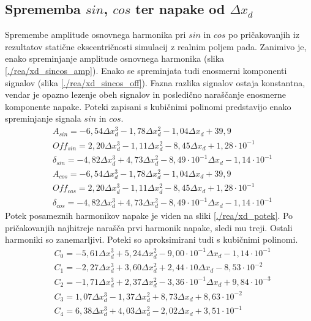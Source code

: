 \subsection{Sprememba $sin$, $cos$ ter napake od $\Delta x_d$}
Spremembe amplitude osnovnega harmonika pri $sin$ in $cos$ po pričakovanjih iz rezultatov statične ekscentričnosti simulacij z realnim poljem pada. Zanimivo je, enako spreminjanje amplitude osnovnega harmonika (slika \ref{./rea/xd_sincos_amp}). Enako se spreminjata tudi enosmerni komponenti signalov (slika \ref{./rea/xd_sincos_off}). Fazna razlika signalov ostaja konstantna, vendar je opazno lezenje obeh signalov in posledično naraščanje enosmerne komponente napake.
Poteki zapisani s kubičnimi polinomi predstavijo enako spreminjanje signala $sin$ in $cos$.
\begin{eqnarray}
&A_{sin} = -6,54\Delta x_d^3-1,78\Delta x_d^2-1,04\Delta x_d+39,9\\     
&Off_{sin} = 2,20\Delta x_d^3-1,11\Delta x_d^2-8,45\Delta x_d+1,28\cdot 10^{-1}\\   
&\delta_{sin} = -4,82\Delta x_d^3+4,73\Delta x_d^2-8,49\cdot 10^{-1}\Delta x_d-1,14\cdot 10^{-1}\\
&A_{cos} = -6,54\Delta x_d^3-1,78\Delta x_d^2-1,04\Delta x_d+39,9\\     
&Off_{cos} = 2,20\Delta x_d^3-1,11\Delta x_d^2-8,45\Delta x_d+1,28\cdot 10^{-1}\\   
&\delta_{cos} = -4,82\Delta x_d^3+4,73\Delta x_d^2-8,49\cdot 10^{-1}\Delta x_d-1,14\cdot 10^{-1}
\end{eqnarray}
Potek posameznih harmonikov napake je viden na sliki \ref{./rea/xd_potek}. Po pričakovanjih najhitreje narašča prvi harmonik napake, sledi mu treji. Ostali harmoniki so zanemarljivi. Poteki so aproksimirani tudi s kubičnimi polinomi.
\begin{eqnarray}
&C_0 =-5,61\Delta x_d^{3}+5,24\Delta x_d^{2}-9,00\cdot 10^{-1}\Delta x_d-1,14\cdot 10^{-1} \\
&C_1 =-2,27\Delta x_d^{3}+3,60\Delta x_d^{2}+2,44\cdot 10\Delta x_d-8,53\cdot 10^{-2} \\     
&C_2 =-1,71\Delta x_d^{3}+2,37\Delta x_d^{2}-3,36\cdot 10^{-1}\Delta x_d+9,84\cdot 10^{-3} \\
&C_3 =1,07\Delta x_d^{3}-1,37\Delta x_d^{2}+8,73\Delta x_d+8,63\cdot 10^{-2} \\              
&C_4 =6,38\Delta x_d^{3}+4,03\Delta x_d^{2}-2,02\Delta x_d+3,51\cdot 10^{-1}       
\end{eqnarray}

